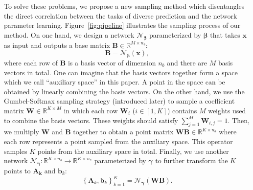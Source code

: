 \documentclass[sigconf,screen,nonacm]{acmart}
\begin{document}
	To solve these problems, we propose a new sampling method which disentangles the direct correlation between the tasks of diverse prediction and the network parameter learning. Figure~\ref{fig:pipeline} illustrates the sampling process of our method. On one hand, we design a network $\mathcal{N}_{\bm{\beta}}$ parameterized by $\bm{\beta}$ that takes $\mathbf{x}$ as input and outputs a base matrix $\mathbf{B}\in \mathbb{R}^{M \times n_b}$:
	\begin{equation}
		\mathbf{B} = \mathcal{N}_{\bm{\beta}}(\mathbf{x}),
	\end{equation}
	where each row of $\mathbf{B}$ is a basis vector of dimension $n_b$ and there are $M$ basis vectors in total. One can imagine that the basis vectors together form a space which we call ``auxiliary space'' in this paper. A point in the space can be obtained by linearly combining the basis vectors. On the other hand, we use the Gumbel-Softmax sampling strategy (introduced later) to sample a coefficient matrix $\mathbf{W}\in \mathbb{R}^{K \times M}$ in which each row $\mathbf{W}_i$ ($i\in[1,K]$) contains $M$ weights used to combine the basis vectors. These weights should satisfy $\sum_{j=1}^M \mathbf{W}_{i,j} = 1$. Then, we multiply $\mathbf{W}$ and $\mathbf{B}$ together to obtain a point matrix $\mathbf{W}\mathbf{B}\in \mathbb{R}^{K \times n_b}$ where each row represents a point sampled from the auxiliary space. This operator samples $K$ points from the auxiliary space in total. Finally, we use another network $\mathcal{N}_{\bm{\gamma}}:\mathbb{R}^{K \times n_b}\rightarrow \mathbb{R}^{K \times n_z}$ parameterized by $\bm{\gamma}$ to further transform the $K$ points to $\mathbf{A_k}$ and $\mathbf{b}_k$:
	\begin{equation}
		\left\{\mathbf{A}_k,\mathbf{b}_k\right\}_{k=1}^K = \mathcal{N}_{\bm{\gamma}}(\mathbf{W}\mathbf{B}).
	\end{equation}
	
\end{document}
